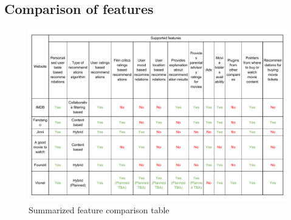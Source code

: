  \subsection{Comparison of features}  
 \label{Comparision_of_features}
  
   \begin{figure}[htbp]
	\centering
		\includegraphics[scale=0.6]{Figures/Features_comparison.pdf}
	\caption[Table : Summarized feature comparison table]{ Summarized feature comparison table}
	\label{Table: Feature comparison}
   \end{figure}
    
